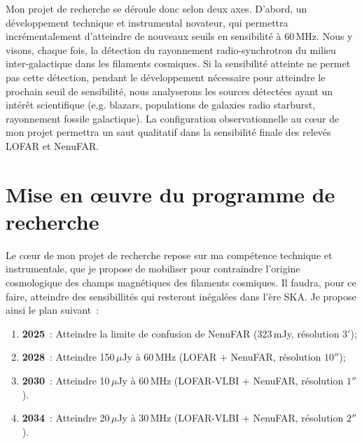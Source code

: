 Mon projet de recherche se d\'eroule donc selon deux axes. D'abord, un d\'eveloppement technique et instrumental novateur, qui permettra incr\'ementalement d'atteindre de nouveaux seuils en sensibilit\'e \`a 60\,MHz. Nous y visons, chaque fois, la d\'etection du rayonnement radio-synchrotron du milieu inter-galactique dans les filaments cosmiques. Si la sensibilit\'e atteinte ne permet pas cette d\'etection, pendant le d\'eveloppement n\'ecessaire pour atteindre le prochain seuil de sensibilit\'e, nous analyserons les sources d\'etect\'ees ayant un int\'er\^et scientifique (e.g. blazars, populations de galaxies radio starburst, rayonnement fossile galactique).
La configuration observationnelle au c{\oe}ur de mon projet permettra un saut qualitatif dans la sensibilit\'e finale des relev\'es LOFAR et NenuFAR.

\newpage

\section{Mise en {\oe}uvre du programme de recherche}

\pg
Le c{\oe}ur de mon projet de recherche repose sur ma comp\'etence technique et instrumentale, que je propose de mobiliser pour contraindre l'origine cosmologique des champs magn\'etiques des filaments cosmiques. 
Il faudra, pour ce faire, atteindre des sensibillit\'es qui resteront in\'egal\'ees dans l'\`ere SKA. Je propose ainsi le plan suivant~:

\begin{tcolorbox}[colback=green!10, colframe=green!50!black, arc=3mm, boxrule=1pt]
\begin{enumerate}
	\item \textbf{2025}~: Atteindre la limite de confusion de NenuFAR (323\,mJy, r\'esolution $3'$);
	\item \textbf{2028}~: Atteindre 150\,$\mu$Jy \`a 60\,MHz (LOFAR + NenuFAR, r\'esolution $10''$);
	\item \textbf{2030}~: Atteindre 10\,$\mu$Jy \`a 60\,MHz (LOFAR-VLBI + NenuFAR, r\'esolution $1''$).
	\item \textbf{2034}~: Atteindre 20\,$\mu$Jy \`a 30\,MHz (LOFAR-VLBI + NenuFAR, r\'esolution $2''$).
\end{enumerate}
\end{tcolorbox}


